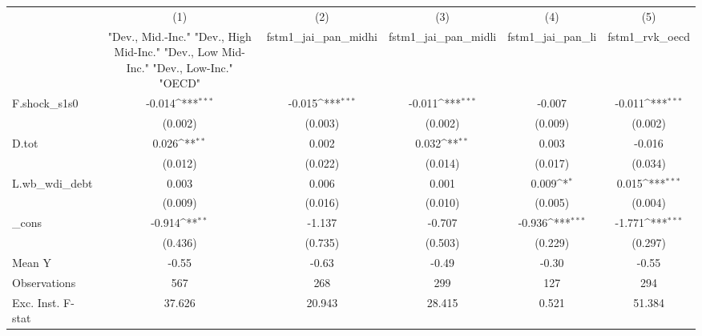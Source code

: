 {
\def\sym#1{\ifmmode^{#1}\else\(^{#1}\)\fi}
\begin{tabular}{l*{5}{c}}
\toprule
            &\multicolumn{1}{c}{(1)}&\multicolumn{1}{c}{(2)}&\multicolumn{1}{c}{(3)}&\multicolumn{1}{c}{(4)}&\multicolumn{1}{c}{(5)}\\
            &\multicolumn{1}{c}{ "Dev., Mid.-Inc." "Dev., High Mid-Inc." "Dev., Low Mid-Inc." "Dev., Low-Inc." "OECD" }&\multicolumn{1}{c}{fstm1\_jai\_pan\_midhi}&\multicolumn{1}{c}{fstm1\_jai\_pan\_midli}&\multicolumn{1}{c}{fstm1\_jai\_pan\_li}&\multicolumn{1}{c}{fstm1\_rvk\_oecd}\\
\midrule
F.shock\_s1s0&      -0.014\sym{***}&      -0.015\sym{***}&      -0.011\sym{***}&      -0.007         &      -0.011\sym{***}\\
            &     (0.002)         &     (0.003)         &     (0.002)         &     (0.009)         &     (0.002)         \\
\addlinespace
D.tot       &       0.026\sym{**} &       0.002         &       0.032\sym{**} &       0.003         &      -0.016         \\
            &     (0.012)         &     (0.022)         &     (0.014)         &     (0.017)         &     (0.034)         \\
\addlinespace
L.wb\_wdi\_debt&       0.003         &       0.006         &       0.001         &       0.009\sym{*}  &       0.015\sym{***}\\
            &     (0.009)         &     (0.016)         &     (0.010)         &     (0.005)         &     (0.004)         \\
\addlinespace
\_cons      &      -0.914\sym{**} &      -1.137         &      -0.707         &      -0.936\sym{***}&      -1.771\sym{***}\\
            &     (0.436)         &     (0.735)         &     (0.503)         &     (0.229)         &     (0.297)         \\
\midrule
Mean Y      &       -0.55         &       -0.63         &       -0.49         &       -0.30         &       -0.55         \\
Observations&         567         &         268         &         299         &         127         &         294         \\
Exc. Inst. F-stat&      37.626         &      20.943         &      28.415         &       0.521         &      51.384         \\
\bottomrule
\end{tabular}
}
